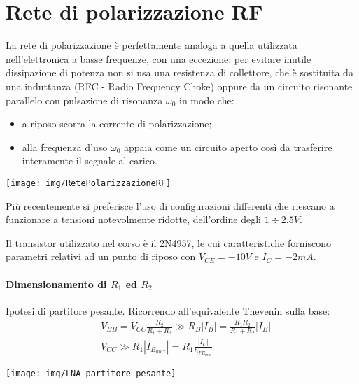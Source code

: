 \section{Rete di polarizzazione RF}
\begin{minipage}{.5\linewidth}
La rete di polarizzazione è perfettamente analoga a quella utilizzata nell'elettronica a basse frequenze, con una eccezione: per evitare inutile dissipazione di potenza non si usa una resistenza di collettore, che è sostituita da una induttanza (RFC - Radio Frequency Choke) oppure da un circuito risonante parallelo con pulsazione di risonanza $\omega_0$ in modo che:
\begin{itemize}
	\item a riposo scorra la corrente di polarizzazione;
	\item alla frequenza d'uso $\omega_0$ appaia come un circuito aperto così da trasferire interamente il segnale al carico.
\end{itemize}
\end{minipage}
\begin{minipage}{.5\linewidth}
\null \vfill
\texttt{[image: img/RetePolarizzazioneRF]}
\null \vfill

\end{minipage}

Più recentemente si preferisce l'uso di configurazioni differenti che riescano a funzionare a tensioni notevolmente ridotte, dell'ordine degli $1 \div 2.5 V$.

Il transistor utilizzato nel corso è il 2N4957, le cui caratteristiche forniscono parametri relativi ad un punto di riposo con $V_{CE} = -10V$ e $I_C = -2mA$.

\begin{minipage}{0.7\linewidth}
\paragraph{Dimensionamento di $R_1$ ed $R_2$}
Ipotesi di partitore pesante. Ricorrendo all'equivalente Thevenin sulla base:
\begin{align*}
&V_{BB} = V_{CC} \frac{R_2}{R_1 + R_2} \gg R_B |I_B| = \frac{R_1 R_2}{R_1 + R_2} |I_B|\\
&V_{CC} \gg R_1 |I_{B_{max}}| = R_1 \frac{|I_C|}{h_{FE_{min}}}
\end{align*}
\end{minipage}
\begin{minipage}{0.28\linewidth}
\texttt{[image: img/LNA-partitore-pesante]}
\end{minipage}
